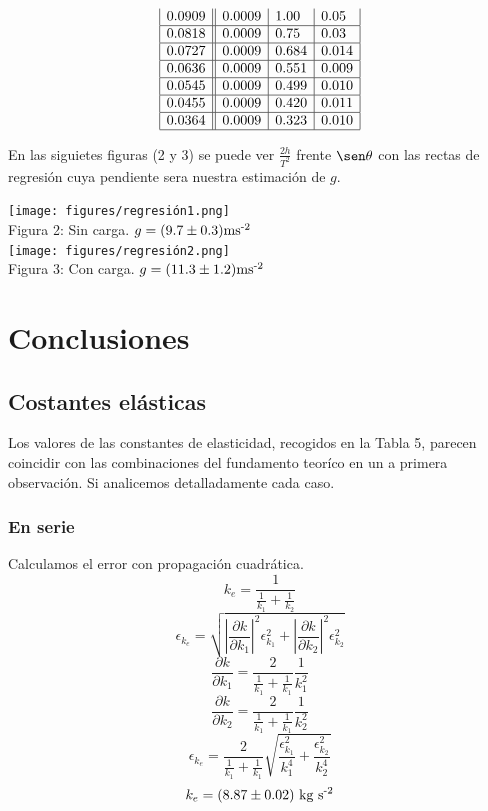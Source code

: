 \documentclass{article}
\begin{document}
\begin{multicols}{2}
\begin{center}
$$\begin{array}{|l||l|l|l|}
        0.0909 & 0.0009 & 1.00  & 0.05   \\ \hline
        0.0818 & 0.0009 & 0.75  & 0.03   \\ \hline
        0.0727 & 0.0009 & 0.684 & 0.014  \\ \hline
        0.0636 & 0.0009 & 0.551 & 0.009  \\ \hline
        0.0545 & 0.0009 & 0.499 & 0.010  \\ \hline
        0.0455 & 0.0009 & 0.420 & 0.011  \\ \hline
        0.0364 & 0.0009 & 0.323 & 0.010  \\ \hline
        \end{array}
    $$
\end{center}
En las siguietes figuras (2 y 3) se puede ver $\frac{2h}{T^2}$ frente $\sen\theta$ con las rectas de regresión cuya pendiente sera nuestra estimación de $g$.
\begin{center}
    \texttt{[image: figures/regresión1.png]}\\
    Figura 2: Sin carga. $g = (9.7\pm 0.3) \text{ms\textsuperscript{-2}}$\\
    \texttt{[image: figures/regresión2.png]}\\
    Figura 3: Con carga. $g = (11.3\pm 1.2) \text{ms\textsuperscript{-2}}$\\
\end{center}
\section*{Conclusiones}
\subsection*{Costantes elásticas}
Los valores de las constantes de elasticidad, recogidos en la Tabla 5, parecen coincidir con las combinaciones del fundamento teoríco en un a primera observación. Si analicemos detalladamente cada caso.
\subsubsection*{En serie}
Calculamos el error con propagación cuadrática.
$$
k_e = \frac{1}{\frac{1}{k_1} + \frac{1}{k_2}}
$$
$$
\epsilon_{k_e} = \sqrt{
    \left|
        \frac{\partial k}{\partial k_1}
    \right|^2 \epsilon_{k_1}^2
    +
    \left|
        \frac{\partial k}{\partial k_2}
    \right|^2 \epsilon_{k_2}^2
}
$$
$$
\frac{\partial k}{\partial k_1} = \frac{2}{\frac{1}{k_1} + \frac{1}{k_1}} \frac{1}{k_1^2}
$$
$$
\frac{\partial k}{\partial k_2} = \frac{2}{\frac{1}{k_1} + \frac{1}{k_1}} \frac{1}{k_2^2}
$$
$$
\epsilon_{k_e} =
\frac{2}{\frac{1}{k_1} + \frac{1}{k_1}}
\sqrt{\frac{\epsilon_{k_1}^2}{k_1^4} + \frac{\epsilon_{k_2}^2}{k_2^4}}
$$
$$
k_e = (8.87\pm 0.02) \text{ kg s\textsuperscript{-2}}
$$

\end{multicols}
\end{document}
